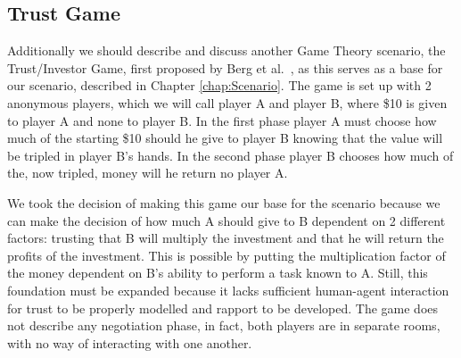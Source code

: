 \subsection{Trust Game}
Additionally we should describe and discuss another Game Theory scenario, the Trust/Investor Game, first proposed by Berg et al.~\cite{JoyceBergJohnDickhaut}, as this serves as a base for our scenario, described in Chapter \ref{chap:Scenario}. The game is set up with 2 anonymous players, which we will call player A and player B, where \$10 is given to player A and none to player B. In the first phase player A must choose how much of the starting \$10 should he give to player B knowing that the value will be tripled in player B’s hands. In the second phase player B chooses how much of the, now tripled, money will he return no player A.

We took the decision of making this game our base for the scenario because we can make the decision of how much A should give to B dependent on 2 different factors: trusting that B will multiply the investment and that he will return the profits of the investment. This is possible by putting the multiplication factor of the money dependent on B's ability to perform a task known to A.
Still, this foundation must be expanded because it lacks sufficient human-agent interaction for trust to be properly modelled and rapport to be developed. The game does not describe any negotiation phase, in fact, both players are in separate rooms, with no way of interacting with one another.